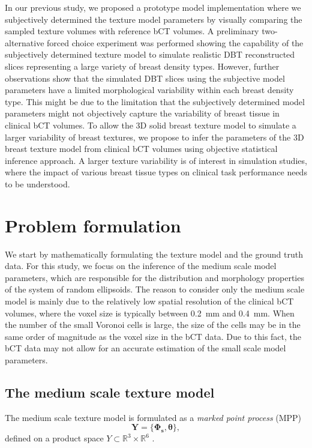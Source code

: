 \documentclass[journal]{IEEEtran}
\begin{document}
In our previous study, we proposed a prototype model implementation
where we subjectively determined the texture model parameters by
visually comparing the sampled texture volumes with reference bCT
volumes. A preliminary two-alternative forced choice experiment was
performed showing the capability of the subjectively determined
texture model to simulate realistic DBT reconstructed slices
representing a large variety of breast density types. However, further
observations show that the simulated DBT slices using the subjective
model parameters have a limited morphological variability within each
breast density type.  This might be due to the limitation that the
subjectively determined model parameters might not objectively capture
the variability of breast tissue in clinical bCT volumes. To allow the
3D solid breast texture model to simulate a larger variability of
breast textures, we propose to infer the parameters of the 3D breast
texture model from clinical bCT volumes using objective statistical
inference approach. A larger texture variability is of interest in
simulation studies, where the impact of various breast tissue types on
clinical task performance needs to be understood.

\section{Problem formulation}
\label{sec:problem-formulation}

We start by mathematically formulating the texture model and the
ground truth data. For this study, we focus on the inference of the
medium scale model parameters, which are responsible for the
distribution and morphology properties of the system of random
ellipsoids. The reason to consider only the medium scale model is
mainly due to the relatively low spatial resolution of the clinical
bCT volumes, where the voxel size is typically between \SI{0.2}{\mm}
and \SI{0.4}{\mm}. When the number of the small Voronoi cells is
large, the size of the cells may be in the same order of magnitude as
the voxel size in the bCT data. Due to this fact, the bCT data may not
allow for an accurate estimation of the small scale model parameters.

\subsection{The medium scale texture model}
\label{sec:medium-scale-texture}

The medium scale texture model is formulated as a \textit{marked point
  process} (MPP)
$$
\mathbf{Y} = \{ \mathbf{\Phi_{s}},\boldsymbol{\theta} \},
$$
defined on a product space
$Y \subset \mathbb{R}^{3} \times \mathbb{R}^6$
\cite{chiu2013stochastic}.
\end{document}
